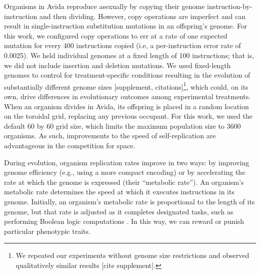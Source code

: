 % 

Organisms in Avida reproduce asexually by copying their genome instruction-by-instruction and then dividing. 
However, copy operations are imperfect and can result in single-instruction substitution mutations in an offspring's genome. 
For this work, we configured copy operations to err at a rate of one expected mutation for every 400 instructions copied (i.e, a per-instruction error rate of 0.0025).
We held individual genomes at a fixed length of 100 instructions; that is, we did not include insertion and deletion mutations. 
We used fixed-length genomes to control for treatment-specific conditions resulting in the evolution of substantially different genome sizes [supplement, citations]\footnote{We repeated our experiments without genome size restrictions and observed qualitatively similar results [cite supplement].}, which could, on its own, drive differences in evolutionary outcomes among experimental treatments.
When an organism divides in Avida, its offspring is placed in a random location on the toroidal grid, replacing any previous occupant.
For this work, we used the default 60 by 60 grid size, which limits the maximum population size to 3600 organisms.
As such, improvements to the speed of self-replication are advantageous in the competition for space.


During evolution, organism replication rates improve in two ways: by improving genome efficiency (e.g., using a more compact encoding) or by accelerating the rate at which the genome is expressed (their ``metabolic rate'').
An organism's metabolic rate determines the speed at which it executes instructions in its genome.
Initially, an organism's metabolic rate is proportional to the length of its genome, but that rate is adjusted as it completes designated tasks, such as performing Boolean logic computations \citep{ofria_avida:_2009}.
In this way, we can reward or punish particular phenotypic traits. 

\vspace{1cm}
